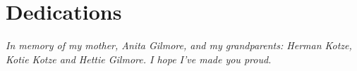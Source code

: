 \chapter{Dedications}%
 \vfill
 \begin{center}\itshape
    In memory of my mother, Anita Gilmore, and my grandparents: Herman Kotze, Kotie Kotze and Hettie Gilmore.
	I hope I've made you proud.
 \end{center}
 \vfill
 \clearpage

\endinput
